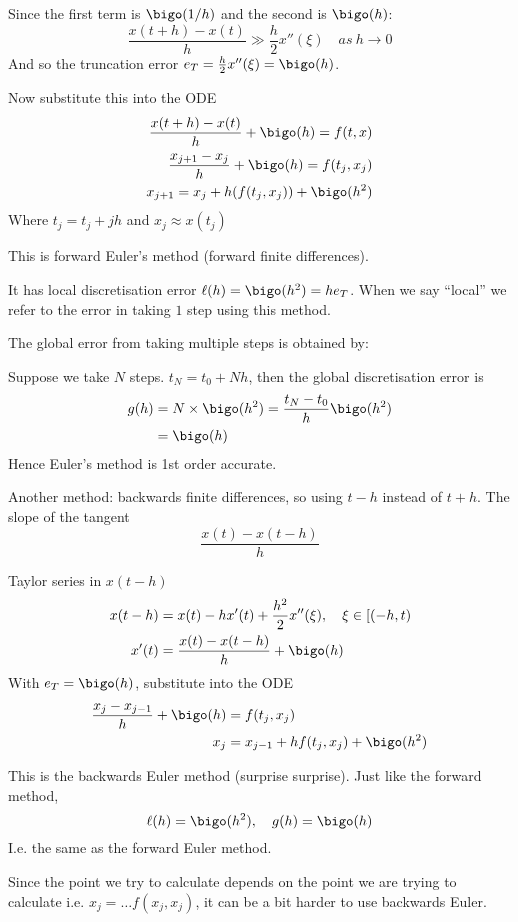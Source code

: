 \documentclass{X:/Documents/Coding/Latex/myassignment}
\begin{document}
Since the first term is $\bigo(1/h)$ and the second is $\bigo(h)$: 
\[\frac{x(t+h)-x(t)}{h} \gg \frac{h}{2} x''(\xi) \quad as \ h\to 0 \]
And so the truncation error $e_T = \frac{h}{2} x''(\xi) = \bigo(h)$. 

Now substitute this into the ODE
\begin{align*}
    \frac{x(t+h)-x(t)}{h} +\bigo(h) = f(t,x)\\
    \frac{x_{j+1} - x_j}{h} +\bigo(h) = f(t_j,x_j)\\
    x_{j+1} = x_j + h(f(t_j,x_j)) + \bigo(h^2)
\end{align*}
Where $t_j = t_j + jh$ and $x_j \approx x(t_j)$

This is forward Euler's method (forward finite differences).

It has local discretisation error $\ell(h) = \bigo(h^2) = he_T$. When we say ``local'' we refer to the error in taking $1$ step using this method.

The global error from taking multiple steps is obtained by:

Suppose we take $N$ steps. $t_N = t_0 + Nh$, then the global discretisation error is
\begin{align*}
    g(h) &= N\times \bigo(h^2) = \frac{t_N - t_0}{h} \bigo(h^2)\\
    &=\bigo(h)
\end{align*}
Hence Euler's method is 1st order accurate.



Another method: backwards finite differences, so using $t-h$ instead of $t+h$.
The slope of the tangent
\[\frac{x(t) - x(t-h)}{h}\]

Taylor series in $x(t-h)$
\begin{align*}
    x(t-h) &= x(t) - hx'(t) + \frac{h^2}{2} x''(\xi), \quad \xi \in \left[(-h,t\right)\\
    x'(t) &= \frac{x(t) - x(t-h)}{h} + \bigo(h)
\end{align*}
With $e_T = \bigo(h)$, substitute into the ODE
\begin{align*}
    \frac{x_j - x_{j-1}}h + \bigo(h) &= f(t_j,x_j)\\
    x_j &= x_{j-1} + hf(t_j,x_j) + \bigo(h^2)
\end{align*}


This is the backwards Euler method (surprise surprise). Just like the forward method,
\[\ell(h) = \bigo(h^2), \quad g(h) = \bigo(h)\]
I.e. the same as the forward Euler method.


Since the point we try to calculate depends on the point we are trying to calculate i.e. $x_j = \ldots f(x_j,x_j)$, it can be a bit harder to use backwards Euler.
\end{document}
